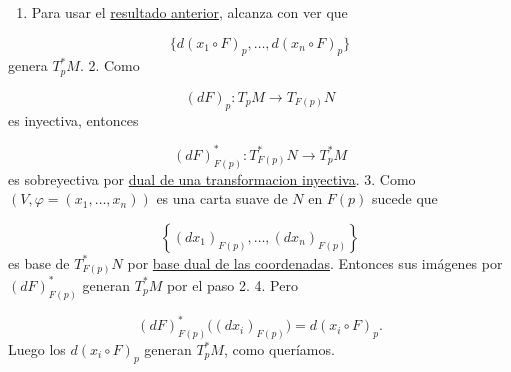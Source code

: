 \begin{bookproof}{}
\begin{enumerate}
\item Para usar el \hyperref[blk:existencia-cartas-dado-diferenciales]{resultado anterior}, alcanza con ver que
\end{enumerate}
\[
\{d(x_1\circ F)_p,\ldots,d(x_n\circ F)_p\}
\]
genera $T_p^\ast M$. 2. Como

\[
(dF)_p:T_pM\to T_{F(p)}N
\]
es inyectiva, entonces

\[
(dF)^\ast_{F(p)}:T_{F(p)}^\ast N\to T_p^\ast M
\]
es sobreyectiva por \hyperref[blk:dual-inyectiva-sobreyectiva]{dual de una transformacion inyectiva}. 3. Como $(V,\varphi=(x_1,\ldots,x_n))$ es una carta suave de $N$ en $F(p)$ sucede que

\[
\left\{(dx_1)_{F(p)},\ldots,(dx_n)_{F(p)}\right\}
\]
es base de $T_{F(p)}^\ast N$ por \hyperref[blk:base-dual-coordenadas]{base dual de las coordenadas}. Entonces sus imágenes por $(dF)^\ast_{F(p)}$ generan $T_p^\ast M$ por el paso 2. 4. Pero

\[
(dF)^\ast_{F(p)}\big((dx_i)_{F(p)}\big)=d(x_i\circ F)_p.
\]
Luego los $d(x_i\circ F)_p$ generan $T_p^\ast M$, como queríamos.

\bookqed
\end{bookproof}
\label{blk:c4d494}
